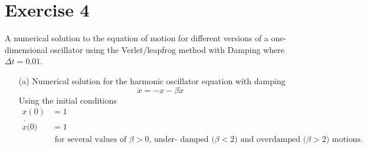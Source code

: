 \documentclass[12pt,a4paper]{article}
\begin{document}
\section*{Exercise 4}
A numerical solution to the equation of motion for different versions of a one-dimensional oscillator using the Verlet/leapfrog  method with Damping where  $\Delta  t = 0.01$.
\begin{enumerate}
		\item[(a)] Numerical solution for the harmonic oscillator equation with damping 
			  \begin{equation}
			  			 \ddot{x}  = -x - \beta \dot{x} 
			  			 \label{eq:damp}
			  \end{equation}
			Using the initial conditions 
			\begin{align*}
							 x(0) &= 1 \\
							\dot{x(}0) &= 1\\
							& \text{ for several values of  $\beta > 0$, under-
damped ($\beta < 2$) and overdamped ($\beta > 2$) motions.}
			\end{align*}						  
			

\end{enumerate}
\end{document}

